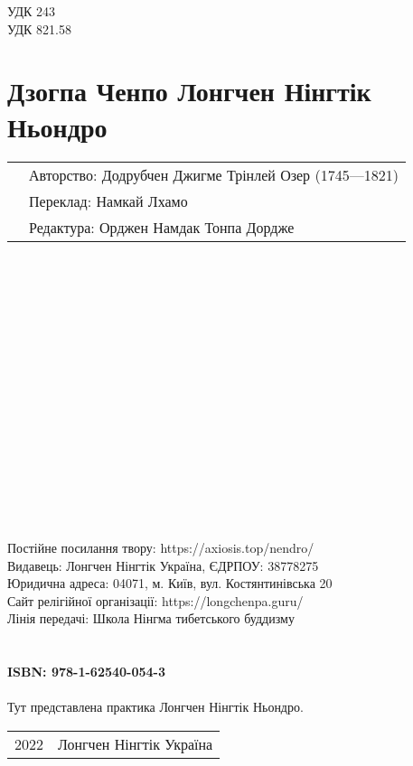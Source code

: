 УДК 243\\
УДК 821.58

\section*{Дзогпа Ченпо Лонгчен Нінгтік Ньондро}

\begin{tabular}{ll}
& Авторство: Додрубчен Джигме Трінлей Озер (1745—1821)\\
& Переклад: Намкай Лхамо\\
& Редактура: Орджен Намдак Тонпа Дордже\\
\end{tabular}
\\
\\
\\
\\
\\
\\
\\
\\
\\
\\
\\
\\
\\
\\
\\
\\
Постійне посилання твору: https://axiosis.top/nendro/ \\
Видавець: Лонгчен Нінгтік Україна, ЄДРПОУ: 38778275 \\
Юридична адреса: 04071, м. Київ, вул. Костянтинівська 20 \\
Сайт релігійної організації: https://longchenpa.guru/ \\
Лінія передачі: Школа Нінгма тибетського буддизму \\
\\
\\
{\bf ISBN: 978-1-62540-054-3 \hspace{2em}}
\\
\\
Тут представлена практика Лонгчен Нінгтік Ньондро.
\\

\begin{tabular}{ll}
\textcopyright{} 2022 & Лонгчен Нінгтік Україна
\end{tabular}
